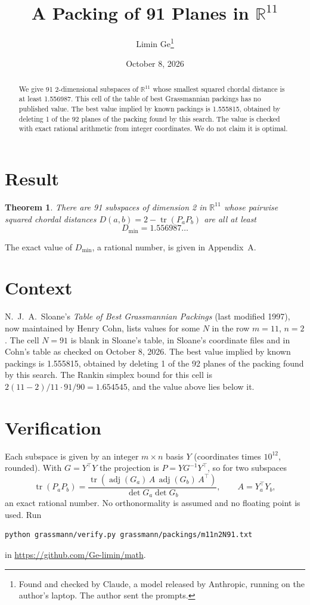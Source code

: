 \documentclass[11pt,a4paper]{article}
\title{A Packing of 91 Planes in $\mathbb{R}^{11}$}
\author{Limin Ge\thanks{Found and checked by Claude, a model released by Anthropic, running on the author's laptop. The author sent the prompts.}}
\date{October 8, 2026}
\newtheorem*{theorem}{Theorem}
\begin{document}
\maketitle
\begin{abstract}
We give 91 2-dimensional subspaces of $\mathbb{R}^{11}$ whose smallest squared chordal distance is at least 1.556987. This cell of the table of best Grassmannian packings has no published value. The best value implied by known packings is 1.555815, obtained by deleting 1 of the 92 planes of the packing found by this search. The value is checked with exact rational arithmetic from integer coordinates. We do not claim it is optimal.
\end{abstract}

\section{Result}
\begin{theorem}
There are 91 subspaces of dimension 2 in $\mathbb{R}^{11}$ whose pairwise squared chordal distances $D(a,b) = 2 - \operatorname{tr}(P_aP_b)$ are all at least
\[ D_{\min} = 1.556987\ldots \]
\end{theorem}
The exact value of $D_{\min}$, a rational number, is given in Appendix~A.


\section{Context}
N.~J.~A.~Sloane's \emph{Table of Best Grassmannian Packings} (last modified 1997), now maintained by Henry Cohn, lists values for some $N$ in the row $m=11$, $n=2$. The cell $N=91$ is blank in Sloane's table, in Sloane's coordinate files and in Cohn's table as checked on October 8, 2026. The best value implied by known packings is 1.555815, obtained by deleting 1 of the 92 planes of the packing found by this search. The Rankin simplex bound for this cell is $2(11-2)/11\cdot 91/90 = 1.654545$, and the value above lies below it.


\section{Verification}
Each subspace is given by an integer $m\times n$ basis $Y$ (coordinates times $10^{12}$, rounded). With $G=Y^\top Y$ the projection is $P=YG^{-1}Y^\top$, so for two subspaces
\[ \operatorname{tr}(P_aP_b)=\frac{\operatorname{tr}(\operatorname{adj}(G_a)\,A\,\operatorname{adj}(G_b)\,A^\top)}{\det G_a\det G_b},\qquad A=Y_a^\top Y_b, \]
an exact rational number. No orthonormality is assumed and no floating point is used. Run
\begin{verbatim}
python grassmann/verify.py grassmann/packings/m11n2N91.txt
\end{verbatim}
in \url{https://github.com/Ge-limin/math}.
\end{document}
